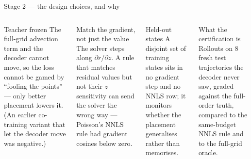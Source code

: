\documentclass[10pt,aspectratio=169]{beamer}
\begin{document}
\begin{frame}{Stage 2 --- the design choices, and why}
  \begin{columns}[T]
    \begin{block}{Teacher frozen}
      The full-grid advection term and the decoder cannot move, so the loss cannot be gamed by ``fooling the points'' --- only better placement lowers it. (An earlier co-training variant that let the decoder move was negative.)
    \end{block}
    \begin{block}{Match the gradient, not just the value}
      The solver steps along $\partial r/\partial z$. A rule that matches residual values but not their $z$-sensitivity can send the solver the wrong way --- Poisson's NNLS rule had gradient cosines below zero.
    \end{block}
    \begin{block}{Held-out states}
      A disjoint set of training states sits in no gradient step and no NNLS row; it monitors whether the placement generalises rather than memorises.
    \end{block}
    \begin{block}{What the certification is}
      Rollouts on 8 fresh test trajectories the decoder never saw, graded against the full-order truth, compared to the same-budget NNLS rule and to the full-grid oracle.
    \end{block}
  \end{columns}
\end{frame}
\end{document}
